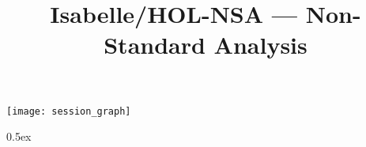 \documentclass[11pt,a4paper]{article}
\begin{document}
\title{Isabelle/HOL-NSA --- Non-Standard Analysis}
\maketitle

\tableofcontents

\begin{center}
  \texttt{[image: session\_graph]}
\end{center}

\newpage

\renewcommand{\setisabellecontext}[1]{\markright{THEORY~``#1''}}

\parindent 0pt\parskip 0.5ex

\end{document}
